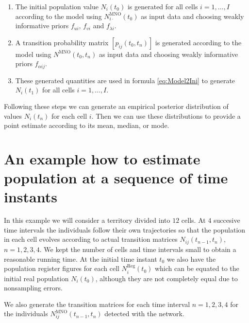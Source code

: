 \documentclass[12pt, a4paper]{article}
\begin{document}
\begin{enumerate}
	\item The initial population value $N_{i}(t_{0})$ is generated for all cells $i=1,\dots, I$ according to the 
	model using $N_{i\cdot}^{\textrm{MNO}}(t_{0})$ as input data and choosing weakly informative priors $f_{ui}$, $f_{vi}$ and $f_{\lambda i}$.
	\item A transition probability matrix $[p_{ij}(t_{0}, t_{n})]$ is generated according to the 
	model using $N^{\textrm{MNO}}(t_{0}, t_{n})$ as input data and choosing weakly informative priors $f_{\alpha ij}$.
	\item These generated quantities are used in formula \eqref{eq:Model2Ini} to generate $N_{i}(t_{1})$ for all cells $i=1,\dots,I$.
\end{enumerate}

Following these steps we can generate an empirical posterior distribution of values 
$N_{i}(t_{n})$ for each cell $i$. Then we can use these distributions to provide a point estimate 
according to its mean, median, or mode.


\section{An example how to estimate population at a sequence of time instants}

In this example we will consider a territory divided into $12$ cells. At $4$ succesive time intervals 
the individuals follow their own trajectories so that the population in each cell evolves according to 
actual transition matrices $N_{ij}(t_{n-1}, t_{n})$, $n=1,2,3,4$. 
We kept the number of cells and time intervals small to obtain a reasonable running time.
At the initial time instant $t_{0}$ we 
also have the population register figures for each cell $N_{i}^{\textrm{Reg}}(t_{0})$ which can 
be equated to the initial real population $N_{i}(t_{0})$, although they are not completely 
equal due to nonsampling errors. 

We also generate the transition matrices for each time interval $n=1,2,3,4$ for the 
individuals $N_{ij}^{\textrm{MNO}}(t_{n-1}, t_{n})$ detected with the network.
\end{document}
